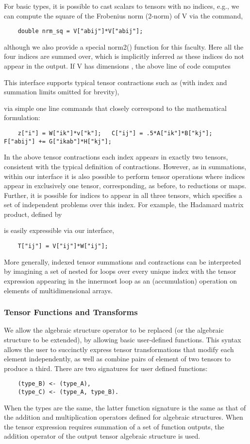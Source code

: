 For basic types, it is possible to cast scalars to tensors with no indices, e.g., we can compute the square of the Frobenius norm (2-norm) of {\CD V} via the command,
\begin{lstlisting}
    double nrm_sq = V["abij"]*V["abij"];
\end{lstlisting}
although we also provide a special {\kwstyle norm2()} function for this faculty.
Here all the four indices  are summed over, which is implicitly inferred as these indices do not appear in the output.
If {\CD V} has dimensions , the above line of code computes

This interface supports typical tensor contractions such as (with index and summation limits omitted for brevity),

via simple one line commands that closely correspond to the mathematical formulation:
\begin{lstlisting}
    z["i"] = W["ik"]*v["k"];   C["ij"] = .5*A["ik"]*B["kj"];   F["abij"] += G["ikab"]*H["kj"];
\end{lstlisting}
In the above tensor contractions each index appears in exactly two tensors, consistent with the typical definition of contractions.
However, as in summations, within our interface it is also possible to perform tensor operations where indices appear in exclusively one tensor, corresponding, as before, to reductions or maps.
Further, it is possible for indices to appear in all three tensors, which specifies a set of independent problems over this index.
For example, the Hadamard matrix product, defined by

is easily expressible via our interface,
\begin{lstlisting}
    T["ij"] = V["ij"]*W["ij"];
\end{lstlisting}
More generally, indexed tensor summations and contractions can be interpreted by imagining a set of nested for loops over every unique index with the tensor expression appearing in the innermost loop as an (accumulation) operation on elements of multidimensional arrays.




\subsubsection{Tensor Functions and Transforms}

We allow the algebraic structure operator to be replaced (or the algebraic structure to be extended), by allowing basic user-defined functions.
This syntax allows the user to succinctly express tensor transformations that modify each element independently, as well as combine pairs of element of two tensors to produce a third.
There are two signatures for user defined functions:
\begin{lstlisting}
    (type_B) <- (type_A),
    (type_C) <- (type_A, type_B).
\end{lstlisting}
When the types are the same, the latter function signature is the same as that of the addition and multiplication operators defined for algebraic structures.
When the tensor expression requires summation of a set of function outputs, the addition operator of the output tensor algebraic structure is used.

